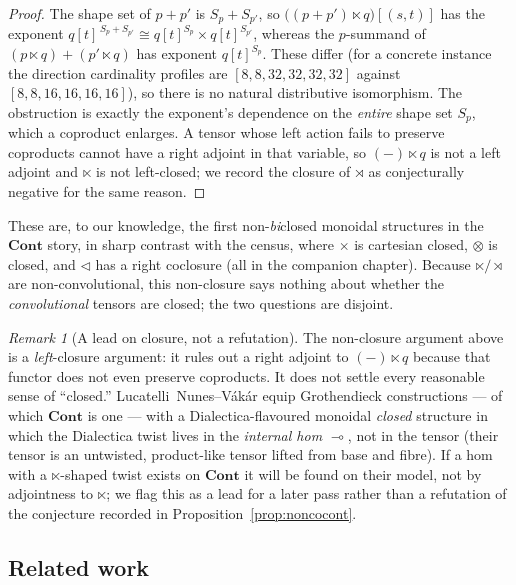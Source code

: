 \documentclass[11pt,a4paper]{article}
\newcommand{\Cont}{\mathbf{Cont}}
\newcommand{\tri}{\mathbin{\triangleleft}}
\newcommand{\dir}{\mathbin{\otimes}}
\theoremstyle{plain}
\theoremstyle{definition}
\theoremstyle{remark}
\newtheorem{Remark}[Theorem]{Remark}
\begin{document}
\begin{proof}
The shape set of $p+p'$ is $S_p+S_{p'}$, so
$\bigl((p+p')\ltimes q\bigr)[(s,t)]$ has the exponent
$q[t]^{\,S_p+S_{p'}}\cong q[t]^{S_p}\times q[t]^{S_{p'}}$, whereas the
$p$-summand of $(p\ltimes q)+(p'\ltimes q)$ has exponent $q[t]^{S_p}$. These
differ (for a concrete instance the direction cardinality profiles are
$[8,8,32,32,32,32]$ against $[8,8,16,16,16,16]$), so there is no natural
distributive isomorphism. The obstruction is exactly the exponent's dependence
on the \emph{entire} shape set $S_p$, which a coproduct enlarges. A tensor whose
left action fails to preserve coproducts cannot have a right adjoint in that
variable, so $(-)\ltimes q$ is not a left adjoint and $\ltimes$ is not
left-closed; we record the closure of $\rtimes$ as conjecturally negative for
the same reason.
\end{proof}

These are, to our knowledge, the first non-\emph{bi}closed monoidal structures in
the $\Cont$ story, in sharp contrast with the census, where $\times$ is cartesian
closed, $\dir$ is closed, and $\tri$ has a right coclosure (all in the companion
chapter). Because
$\ltimes/\rtimes$ are non-convolutional, this non-closure says nothing about
whether the \emph{convolutional} tensors are closed; the two questions are
disjoint.

\begin{Remark}[A lead on closure, not a refutation]
\label{rem:dia-closure}
The non-closure argument above is a \emph{left}-closure argument: it rules out a
right adjoint to $(-)\ltimes q$ because that functor does not even preserve
coproducts. It does not settle every reasonable sense of ``closed.''
Lucatelli~Nunes--Vákár \cite{lnv2405} equip Grothendieck constructions --- of
which $\Cont$ is one --- with a Dialectica-flavoured monoidal \emph{closed}
structure in which the Dialectica twist lives in the \emph{internal hom}
$\multimap$, not in the tensor (their tensor is an untwisted, product-like
tensor lifted from base and fibre). If a hom
with a $\ltimes$-shaped twist exists on $\Cont$ it will be found on their model,
not by adjointness to $\ltimes$; we flag this as a lead for a later pass rather
than a refutation of the conjecture recorded in
Proposition~\ref{prop:noncocont}.
\end{Remark}

\subsection{Related work}
\label{sec:dia-related}
\end{document}
